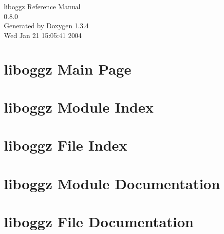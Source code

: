 \documentclass[a4paper]{book}
\begin{document}
\begin{titlepage}
\vspace*{7cm}
\begin{center}
{\Large liboggz Reference Manual\\[1ex]\large 0.8.0 }\\
\vspace*{1cm}
{\large Generated by Doxygen 1.3.4}\\
\vspace*{0.5cm}
{\small Wed Jan 21 15:05:41 2004}\\
\end{center}
\end{titlepage}
\clearemptydoublepage
{}
\tableofcontents
\clearemptydoublepage
{}
\chapter{liboggz Main Page}
\label{index}
\chapter{liboggz Module Index}

\chapter{liboggz File Index}

\chapter{liboggz Module Documentation}










\chapter{liboggz File Documentation}



\printindex
\end{document}

